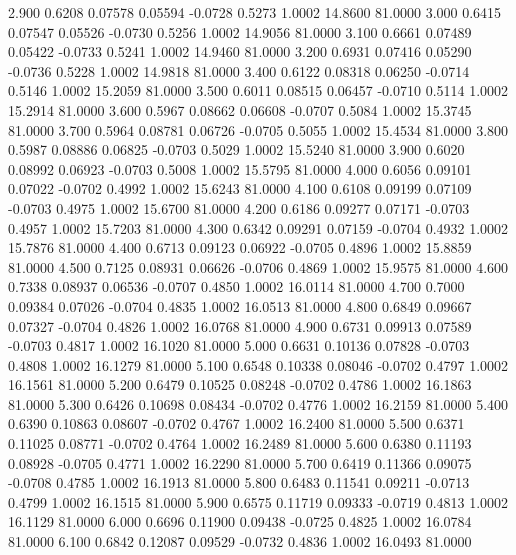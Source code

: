    2.900   0.6208   0.07578   0.05594  -0.0728   0.5273   1.0002  14.8600  81.0000
   3.000   0.6415   0.07547   0.05526  -0.0730   0.5256   1.0002  14.9056  81.0000
   3.100   0.6661   0.07489   0.05422  -0.0733   0.5241   1.0002  14.9460  81.0000
   3.200   0.6931   0.07416   0.05290  -0.0736   0.5228   1.0002  14.9818  81.0000
   3.400   0.6122   0.08318   0.06250  -0.0714   0.5146   1.0002  15.2059  81.0000
   3.500   0.6011   0.08515   0.06457  -0.0710   0.5114   1.0002  15.2914  81.0000
   3.600   0.5967   0.08662   0.06608  -0.0707   0.5084   1.0002  15.3745  81.0000
   3.700   0.5964   0.08781   0.06726  -0.0705   0.5055   1.0002  15.4534  81.0000
   3.800   0.5987   0.08886   0.06825  -0.0703   0.5029   1.0002  15.5240  81.0000
   3.900   0.6020   0.08992   0.06923  -0.0703   0.5008   1.0002  15.5795  81.0000
   4.000   0.6056   0.09101   0.07022  -0.0702   0.4992   1.0002  15.6243  81.0000
   4.100   0.6108   0.09199   0.07109  -0.0703   0.4975   1.0002  15.6700  81.0000
   4.200   0.6186   0.09277   0.07171  -0.0703   0.4957   1.0002  15.7203  81.0000
   4.300   0.6342   0.09291   0.07159  -0.0704   0.4932   1.0002  15.7876  81.0000
   4.400   0.6713   0.09123   0.06922  -0.0705   0.4896   1.0002  15.8859  81.0000
   4.500   0.7125   0.08931   0.06626  -0.0706   0.4869   1.0002  15.9575  81.0000
   4.600   0.7338   0.08937   0.06536  -0.0707   0.4850   1.0002  16.0114  81.0000
   4.700   0.7000   0.09384   0.07026  -0.0704   0.4835   1.0002  16.0513  81.0000
   4.800   0.6849   0.09667   0.07327  -0.0704   0.4826   1.0002  16.0768  81.0000
   4.900   0.6731   0.09913   0.07589  -0.0703   0.4817   1.0002  16.1020  81.0000
   5.000   0.6631   0.10136   0.07828  -0.0703   0.4808   1.0002  16.1279  81.0000
   5.100   0.6548   0.10338   0.08046  -0.0702   0.4797   1.0002  16.1561  81.0000
   5.200   0.6479   0.10525   0.08248  -0.0702   0.4786   1.0002  16.1863  81.0000
   5.300   0.6426   0.10698   0.08434  -0.0702   0.4776   1.0002  16.2159  81.0000
   5.400   0.6390   0.10863   0.08607  -0.0702   0.4767   1.0002  16.2400  81.0000
   5.500   0.6371   0.11025   0.08771  -0.0702   0.4764   1.0002  16.2489  81.0000
   5.600   0.6380   0.11193   0.08928  -0.0705   0.4771   1.0002  16.2290  81.0000
   5.700   0.6419   0.11366   0.09075  -0.0708   0.4785   1.0002  16.1913  81.0000
   5.800   0.6483   0.11541   0.09211  -0.0713   0.4799   1.0002  16.1515  81.0000
   5.900   0.6575   0.11719   0.09333  -0.0719   0.4813   1.0002  16.1129  81.0000
   6.000   0.6696   0.11900   0.09438  -0.0725   0.4825   1.0002  16.0784  81.0000
   6.100   0.6842   0.12087   0.09529  -0.0732   0.4836   1.0002  16.0493  81.0000
